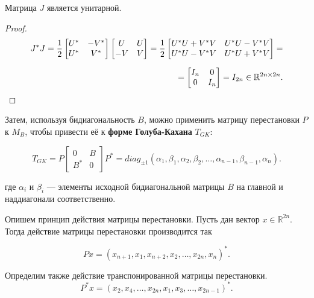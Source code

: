 \begin{claim}
    Матрица \(J\) является унитарной.
\end{claim}
\begin{proof}
    \begin{equation*}
        \begin{split}
            J^* J= \frac{1}{2} \begin{bmatrix} U^* &-V^*\\ U^* & V^* \end{bmatrix} \begin{bmatrix} U & U \\ -V & V \end{bmatrix} = \frac{1}{2} \begin{bmatrix}
        U^*U+V^*V & U^*U-V^*V \\ U^*U-V^*V & U^*U+V^*V
    \end{bmatrix} =\\[6pt] = \begin{bmatrix}
        I_n & 0 \\ 0 & I_n
    \end{bmatrix} = I_{2n} \in \mathbb{R}^{2n \times 2n}.
        \end{split}
    \end{equation*}
\end{proof}

Затем, используя бидиагональность \( B \), можно применить матрицу перестановки \( P \) к \( M_B \), чтобы привести её к \textbf{форме Голуба-Кахана} \( T_{GK} \):

\begin{equation}
T_{GK} = P \begin{bmatrix} 0 & B \\ B^* & 0 \end{bmatrix} P^* = diag_{\pm 1}(\alpha_1,\beta_1,\alpha_2,\beta_2,\dots,\alpha_{n-1},\beta_{n-1},\alpha_{n}).
\end{equation}

где \( \alpha_i \) и \( \beta_i \) — элементы исходной бидиагональной матрицы \( B \) на главной и наддиагонали соответственно. 

Опишем принцип действия матрицы перестановки. Пусть дан вектор \(x \in \mathbb{R}^{2n} \). Тогда действие матрицы перестановки производится так

\begin{equation}
    Px=(x_{n+1},x_1, x_{n+2},x_2,\dots,x_{2n},x_n)^*.
\end{equation}
\begin{note}
    Определим также действие транспонированной матрицы перестановки.
    \begin{equation}
        P^*x=(x_2,x_4,\dots,x_{2n},x_1,x_3,\dots,x_{2n-1})^*.
    \end{equation}
\end{note}

